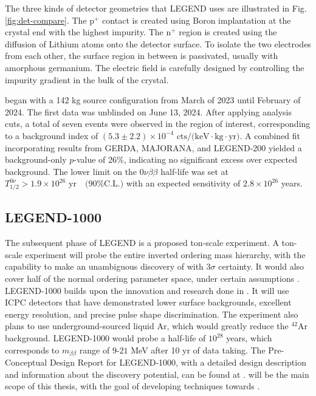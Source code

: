 The three kinds of detector geometries that LEGEND uses are illustrated in Fig. \ref{fig:det-compare}. The p$^+$ contact is created using Boron implantation at the crystal end with the highest impurity. The n$^+$ region is created using the diffusion of Lithium atoms onto the detector surface. To isolate the two electrodes from each other, the surface region in between is passivated, usually with amorphous germanium. The electric field is carefully designed by controlling the impurity gradient in the bulk of the crystal. 


{\Ltwo} began with a 142 kg source configuration from March of 2023 until February of 2024. The first data was unblinded on June 13, 2024. After applying analysis cuts, a total of seven events were observed in the region of interest, corresponding to a background index of $ (5.3 \pm 2.2) \times 10^{-4} \text{ cts/(keV$\cdot$kg$\cdot$yr)}$. A combined fit incorporating results from GERDA, MAJORANA, and LEGEND-200 yielded a background-only $p$-value of 26\%, indicating no significant excess over expected background. The lower limit on the 0$\nu\beta\beta$ half-life was set at $T^{0\nu}_{1/2} > 1.9 \times 10^{26} \text{ yr} \quad \text{(90\% C.L.)}$ with an expected sensitivity of $2.8 \times 10^{26}$ years. \cite{Pertoldi2024}

\subsection{LEGEND-1000}
The subsequent phase of LEGEND is a proposed ton-scale experiment. A ton-scale experiment will probe the entire inverted ordering mass hierarchy, with the capability to make an unambiguous discovery of {\onbb} with $3\sigma$ certainty. It would also cover half of the normal ordering parameter space, under certain assumptions \cite{l1000_pcdr}. LEGEND-1000 builds upon the innovation and research done in {\Ltwo}. It will use ICPC detectors that have demonstrated lower surface backgrounds, excellent energy resolution, and precise pulse shape discrimination. The experiment also plans to use underground-sourced liquid Ar, which would greatly reduce the $^{42}$Ar background. LEGEND-1000 would probe a half-life of $10^{28}$ years, which corresponds to $m_{\beta\beta}$ range of $9$-$21$ MeV after 10 yr of data taking. The Pre-Conceptual Design Report for LEGEND-1000, with a detailed design description and information about the discovery potential, can be found at \cite{l1000_pcdr}. {\Ltwo} will be the main scope of this thesis, with the goal of developing techniques towards {\Lthou}.


